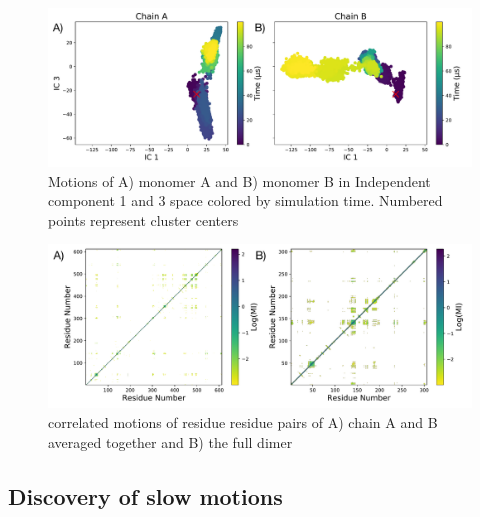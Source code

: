 \documentclass{biophys-new}
\begin{document}
\begin{figure}[hbt!]
\centering
\graphicspath{ {./figures/} }
\includegraphics[width=0.6\linewidth]{fig_4_fdiscolortime_ic3_label.pdf}
\caption{Motions of A) monomer A and B) monomer B in Independent component 1 and 3 space colored by simulation time. Numbered points represent cluster centers}
\label{fig:view}
\end{figure}

\begin{figure}[hbt!]
\centering
\graphicspath{ {./figures/} }
\includegraphics[width=0.6\linewidth]{MI_full_and_average.pdf}
\caption{correlated motions of residue residue pairs of A) chain A and B averaged together and B) the full dimer }
\label{fig:view}
\end{figure}

\subsection*{Discovery of slow motions}
\end{document}
